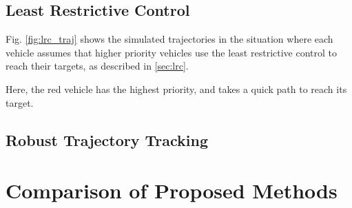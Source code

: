 \subsection{Least Restrictive Control}
Fig. \ref{fig:lrc_traj} shows the simulated trajectories in the situation where each vehicle assumes that higher priority vehicles use the least restrictive control to reach their targets, as described in \ref{sec:lrc}. 

Here, the red vehicle has the highest priority, and takes a quick path to reach its target. 




\subsection{Robust Trajectory Tracking}
%

\section{Comparison of Proposed Methods}